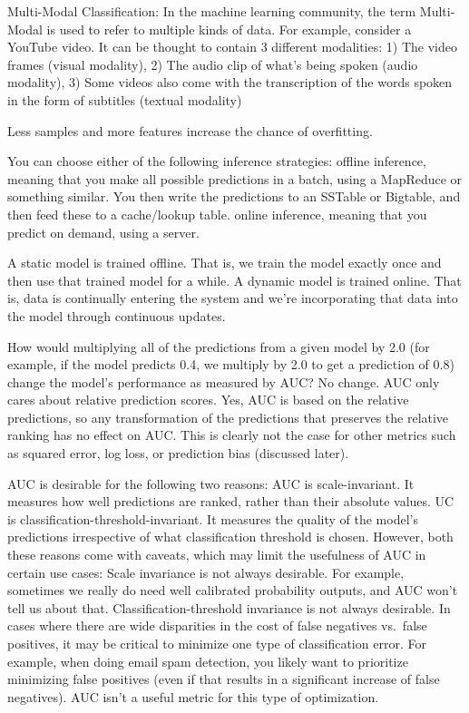 \documentclass[]{book}
\begin{document}
Multi-Modal Classification: In the machine learning community, the term Multi-Modal is used to refer to multiple kinds of data. For example, consider a YouTube video. It can be thought to contain 3 different modalities: 1) The video frames (visual modality), 2) The audio clip of what's being spoken (audio modality), 3) Some videos also come with the transcription of the words spoken in the form of subtitles (textual modality)

Less samples and more features increase the chance of overfitting.

You can choose either of the following inference strategies: offline inference, meaning that you make all possible predictions in a batch, using a MapReduce or something similar. You then write the predictions to an SSTable or Bigtable, and then feed these to a cache/lookup table. online inference, meaning that you predict on demand, using a server.

A static model is trained offline. That is, we train the model exactly once and then use that trained model for a while. A dynamic model is trained online. That is, data is continually entering the system and we're incorporating that data into the model through continuous updates.

How would multiplying all of the predictions from a given model by 2.0 (for example, if the model predicts 0.4, we multiply by 2.0 to get a prediction of 0.8) change the model's performance as measured by AUC? No change. AUC only cares about relative prediction scores. Yes, AUC is based on the relative predictions, so any transformation of the predictions that preserves the relative ranking has no effect on AUC. This is clearly not the case for other metrics such as squared error, log loss, or prediction bias (discussed later).

AUC is desirable for the following two reasons: AUC is scale-invariant. It measures how well predictions are ranked, rather than their absolute values. UC is classification-threshold-invariant. It measures the quality of the model's predictions irrespective of what classification threshold is chosen. However, both these reasons come with caveats, which may limit the usefulness of AUC in certain use cases: Scale invariance is not always desirable. For example, sometimes we really do need well calibrated probability outputs, and AUC won't tell us about that. Classification-threshold invariance is not always desirable. In cases where there are wide disparities in the cost of false negatives vs.~false positives, it may be critical to minimize one type of classification error. For example, when doing email spam detection, you likely want to prioritize minimizing false positives (even if that results in a significant increase of false negatives). AUC isn't a useful metric for this type of optimization.
\end{document}
